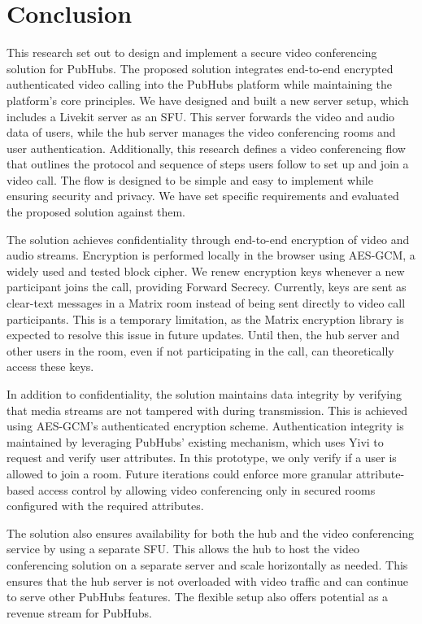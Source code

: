 \documentclass{report}
\begin{document}
\chapter{Conclusion}
This research set out to design and implement a secure video conferencing solution for PubHubs. The proposed
solution integrates end-to-end encrypted authenticated video calling into the PubHubs platform while maintaining
the platform's core principles. We have designed and built a new server setup, which includes a Livekit server as an SFU.
This server forwards the video and audio data of users, while the hub server manages the video conferencing rooms
and user authentication. Additionally, this research defines a video conferencing flow that outlines the protocol
and sequence of steps users follow to set up and join a video call. The flow is designed to be simple and easy to
implement while ensuring security and privacy. We have set specific requirements and evaluated the proposed
solution against them.

The solution achieves confidentiality through end-to-end encryption of video and audio streams. Encryption is
performed locally in the browser using AES-GCM, a widely used and tested block cipher. We renew encryption keys
whenever a new participant joins the call, providing Forward Secrecy. Currently, keys are sent as clear-text
messages in a Matrix room instead of being sent directly to video call participants. This is a temporary
limitation, as the Matrix encryption library is expected to resolve this issue in future updates. Until then, the
hub server and other users in the room, even if not participating in the call, can theoretically access these keys.

In addition to confidentiality, the solution maintains data integrity by verifying that media streams are not
tampered with during transmission. This is achieved using AES-GCM’s authenticated encryption scheme. Authentication
integrity is maintained by leveraging PubHubs’ existing mechanism, which uses Yivi to request and verify user
attributes. In this prototype, we only verify if a user is allowed to join a room. Future iterations could enforce
more granular attribute-based access control by allowing video conferencing only in secured rooms configured with
the required attributes.

The solution also ensures availability for both the hub and the video conferencing service by using a separate SFU. This
allows the hub to host the video conferencing solution on a separate server and scale horizontally as needed. This
ensures that the hub server is not overloaded with video traffic and can continue to serve other PubHubs features.
The flexible setup also offers potential as a revenue stream for PubHubs.
\end{document}
